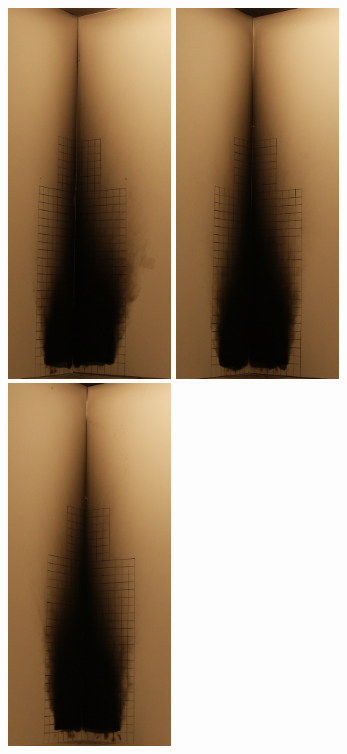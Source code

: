 \documentclass[twoside]{uocthesis}
\begin{document}
\begin{figure}[p]
	\includegraphics[width=1.7in]{../Figures/GBPUF11_Corner}
	\includegraphics[width=1.7in]{../Figures/GBPUF12_Corner}
	\includegraphics[width=1.7in]{../Figures/GBPUF13_Corner} \\


\end{figure}
\end{document}
